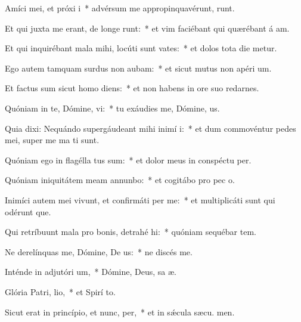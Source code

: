 \item Amíci mei, et próxi i~* advérsum me appropinquavérunt,  runt.
\item Et qui juxta me erant, de longe runt:~* et vim faciébant qui quærébant á am.
\item Et qui inquirébant mala mihi, locúti sunt vates:~* et dolos tota die metur.
\item Ego autem tamquam surdus non aubam:~* et sicut mutus non apéri  um.
\item Et factus sum sicut homo  diens:~* et non habens in ore suo redarnes.
\item Quóniam in te, Dómine, vi:~* tu exáudies me, Dómine,  us.
\item Quia dixi: Nequándo supergáudeant mihi inimí i:~* et dum commovéntur pedes mei, super me ma ti sunt.
\item Quóniam ego in flagélla tus sum:~* et dolor meus in conspéctu  per.
\item Quóniam iniquitátem meam annunbo:~* et cogitábo pro pec o.
\item Inimíci autem mei vivunt, et confirmáti  per me:~* et multiplicáti sunt qui odérunt  que.
\item Qui retríbuunt mala pro bonis, detrahé hi:~* quóniam sequébar tem.
\item Ne derelínquas me, Dómine, De us:~* ne discés  me.
\item Inténde in adjutóri um,~* Dómine, Deus, sa æ.
\item Glória Patri,  lio,~* et Spirí to.
\item Sicut erat in princípio, et nunc,  per,~* et in sǽcula sæcu. men.
